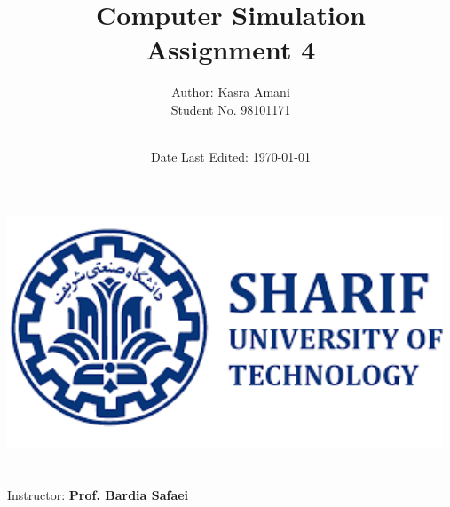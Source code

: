 \title{\Large Computer Simulation  \\[0.5cm]
        \bf\Large Assignment 4}
\author{\large Author: Kasra Amani\\ \normalsize Student No. 98101171 \\ \ \\}
\date{\large Date Last Edited: \today}

\makeatletter
    \begin{titlepage}
        \begin{center}
	   { \includegraphics[width=13cm]{sharif.png}}
	   {\ \\ \ \\}
        \vbox{}\vspace{5cm}
            {\@title }\\[3cm] 
            {\@author}
            {\large Instructor: \bf Prof. Bardia Safaei\\ \ \\}
            {\@date\\}

        \end{center}
    \end{titlepage}
\makeatother